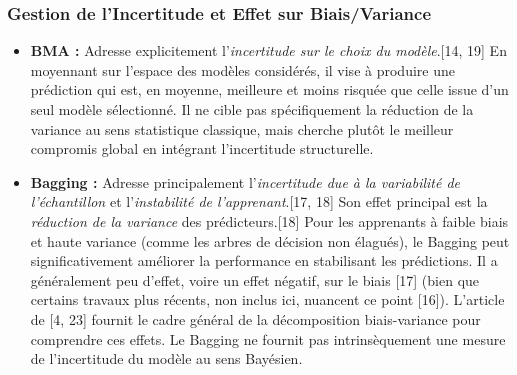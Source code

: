\documentclass[11pt,a4paper]{article}
\begin{document}
\subsubsection{Gestion de l'Incertitude et Effet sur Biais/Variance}
\begin{itemize}
    \item \textbf{BMA :} Adresse explicitement l'\textit{incertitude sur le choix du modèle}.[14, 19] En moyennant sur l'espace des modèles considérés, il vise à produire une prédiction qui est, en moyenne, meilleure et moins risquée que celle issue d'un seul modèle sélectionné. Il ne cible pas spécifiquement la réduction de la variance au sens statistique classique, mais cherche plutôt le meilleur compromis global en intégrant l'incertitude structurelle.
    \item \textbf{Bagging :} Adresse principalement l'\textit{incertitude due à la variabilité de l'échantillon} et l'\textit{instabilité de l'apprenant}.[17, 18] Son effet principal est la \textit{réduction de la variance} des prédicteurs.[18] Pour les apprenants à faible biais et haute variance (comme les arbres de décision non élagués), le Bagging peut significativement améliorer la performance en stabilisant les prédictions. Il a généralement peu d'effet, voire un effet négatif, sur le biais [17] (bien que certains travaux plus récents, non inclus ici, nuancent ce point [16]). L'article de \citet{Domingos2012} [4, 23] fournit le cadre général de la décomposition biais-variance pour comprendre ces effets. Le Bagging ne fournit pas intrinsèquement une mesure de l'incertitude du modèle au sens Bayésien.
\end{itemize}
\end{document}
